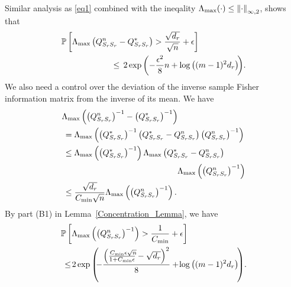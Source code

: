 Similar analysis as \eqref{eq1} combined with the ineqality $\Lambda_{\max}(\cdot)\leq\left\|\cdot\right\|_{\infty,2}$, shows that
\begin{equation}
\begin{aligned}
&\mathbb{P}\left[\Lambda_{\max}\left(Q^n_{S_{r}S_{r}} -Q^*_{S_{r}S_{r}}\right)>\frac{\sqrt{d_{r}}}{\sqrt{n}}+\epsilon\right]\\ &\qquad\qquad\qquad\leq\, 2\exp\left(-\frac{\epsilon^2}{8}n+\log\left((m-1)^2d_{r}\right)\!\right)\!.\\
\end{aligned}
\label{fisher_2_bound}
\end{equation}
We also need a control over the deviation of the inverse sample Fisher information matrix from the inverse of its mean. We have
\begin{equation}
\begin{aligned}
&\Lambda_{\max}\left(\left(Q^n_{S_{r}S_{r}}\right)^{-1} -\left(Q^*_{S_{r}S_{r}}\right)^{-1}\right)\\ &\,=\Lambda_{\max}\left(\left(Q^*_{S_{r}S_{r}}\right)^{-1} \left(Q^*_{S_{r}S_{r}} -Q^n_{S_{r}S_{r}}\right) \left(Q^n_{S_{r}S_{r}}\right)^{-1}\right)\\
&\,\leq\Lambda_{\max}\left(\left(Q^*_{S_{r}S_{r}}\right)^{-1}\right)
\Lambda_{\max}\left(Q^*_{S_{r}S_{r}} -Q^n_{S_{r}S_{r}}\right)\\ &\qquad\qquad\qquad\qquad\qquad\qquad\qquad\Lambda_{\max}\left(\left(Q^n_{S_{r}S_{r}}\right)^{-1}\right)\\
&\,\leq\frac{\sqrt{d_{r}}}{C_{\min}\sqrt{n}} \Lambda_{\max}\left(\left(Q^n_{S_{r}S_{r}}\right)^{-1}\right).\\
\end{aligned}
\nonumber
\end{equation}
By part (B1) in Lemma~\ref{Concentration_Lemma}, we have
\begin{equation}
\begin{aligned}
&\mathbb{P}\left[\Lambda_{\max}\left(\left(\fisher^n_{\support_\svert\support_\svert}\right)^{-1}\right) >\frac{1}{C_{\min}}+\epsilon\right]\\ &\,\leq \! 2\exp\left(\!\!-\frac{\left(\frac{C_{\min}\epsilon\sqrt{n}\!\!}{1+C_{\min}\epsilon}-\sqrt{d_\svert}\right)^2}{8}+\!\log\left((m-1)^2d_\svert\right)\!\right)\!.
\end{aligned}
\label{sample_fisher_2_bound}
\end{equation}
